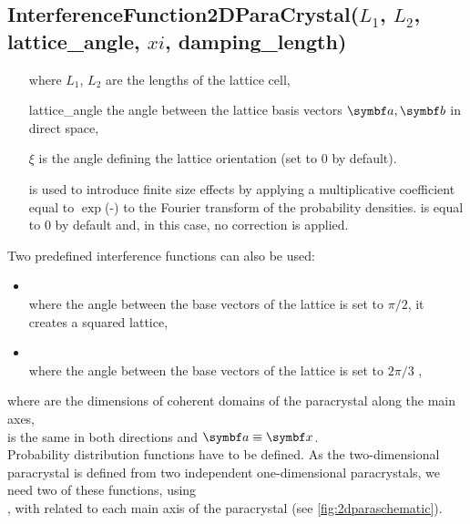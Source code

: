 \FloatBarrier

\newpage%
\subsection{InterferenceFunction2DParaCrystal($L_1$, $L_2$, lattice\_angle, $xi$, damping\_length)} %
\begin{itemize}
\item[where] $L_1$, $L_2$ are the lengths of the lattice cell,
\item[] lattice\_angle the angle between the lattice basis vectors $\v{a}, \v{b}$ in direct space,
\item[] $\xi$ is the angle defining the lattice orientation (set to $0$ by default).
\item[]  is used to introduce finite size effects by applying a multiplicative coefficient equal to  $\exp$(-) to the Fourier transform of the probability densities.  is equal to 0 by default and, in this case, no correction is applied.
\end{itemize}
Two predefined interference functions can also be used:
\begin{itemize}
\item  {}\\
where the angle between the base vectors of the lattice is set to $\pi/2$,
it creates a squared lattice,
\item {}\\
where the angle between the base vectors of the lattice is set to $2\pi/3$ ,
\end{itemize}
where
 are the dimensions of coherent domains of the paracrystal along the main axes,\\  is the same in both directions and $\v{a}\equiv \v{x}$.\\

Probability distribution functions have to be defined. As the two-dimensional paracrystal is defined from two independent one-dimensional paracrystals, we need two of these functions, using\\ , with  related to each main axis of the paracrystal (see \cref{fig:2dparaschematic}).


